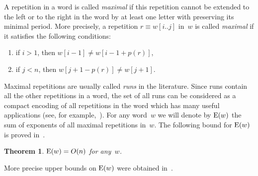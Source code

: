 \documentclass{article}
\newtheorem{theorem}{Theorem}
\begin{document}
A repetition in a word is called {\it maximal} if this repetition cannot be extended 
to the left or to the right in the word by at least one letter with preserving its 
minimal period. More precisely, a repetition $r\equiv w[i..j]$ in~$w$ is called {\it maximal}
if it satisfies the following conditions:
\begin{enumerate}
\item if $i>1$, then $w[i-1]\neq w[i-1+p(r)]$,
\item if $j<n$, then $w[j+1-p(r)]\neq w[j+1]$.
\end{enumerate}
Maximal repetitions are usually called {\it runs} in the literature. Since runs contain 
all the other repetitions in a word, the set of all runs can be considered as a compact 
encoding of all repetitions in the word which has many useful applications (see, 
for example,~\cite{Crochetal1}). For any word~$w$ we will denote by ${\rm E}(w)$ the sum 
of exponents of all maximal repetitions in~$w$. The following bound for ${\rm E}(w)$ is 
proved in~\cite{KK00}.
\begin{theorem}
${\rm E}(w)=O(n)$ for any~$w$.
\label{onsumexp}
\end{theorem}
More precise upper bounds on ${\rm E}(w)$ were obtained in~\cite{CrochIlieTinta, Crochetal11, RunsTheor}.
\end{document}
